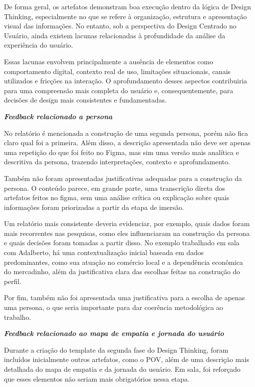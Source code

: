 \documentclass[
  sigconf,
  nonacm, %
  language=portuguese
]{acmart}
\begin{document}
De forma geral, os artefatos demonstram boa execução dentro da lógica de Design Thinking, especialmente no que se refere à organização, estrutura e apresentação visual das informações. No entanto, sob a perspectiva do Design Centrado no Usuário, ainda existem lacunas relacionadas à profundidade da análise da experiência do usuário.

Essas lacunas envolvem principalmente a ausência de elementos como comportamento digital, contexto real de uso, limitações situacionais, canais utilizados e fricções na interação. O aprofundamento desses aspectos contribuiria para uma compreensão mais completa do usuário e, consequentemente, para decisões de design mais consistentes e fundamentadas.

\textit{\textbf{Feedback relacionado a persona}}

No relatório é mencionada a construção de uma segunda persona, porém não fica claro qual foi a primeira. Além disso, a descrição apresentada não deve ser apenas uma repetição do que foi feito no Figma, mas sim uma versão mais analítica e descritiva da persona, trazendo interpretações, contexto e aprofundamento.

Também não foram apresentadas justificativas adequadas para a construção da persona. O conteúdo parece, em grande parte, uma transcrição direta dos artefatos feitos no figma, sem uma análise crítica ou explicação sobre quais informações foram priorizadas a partir da etapa de imersão.

Um relatório mais consistente deveria evidenciar, por exemplo, quais dados foram mais recorrentes nas pesquisas, como eles influenciaram na construção da persona e quais decisões foram tomadas a partir disso. No exemplo trabalhado em sala com Adalberto, há uma contextualização inicial baseada em dados predominantes, como sua atuação no comércio local e a dependência econômica do mercadinho, além da justificativa clara das escolhas feitas na construção do perfil.

Por fim, também não foi apresentada uma justificativa para a escolha de apenas uma persona, o que seria importante para dar coerência metodológica ao trabalho.

\textit{\textbf{Feedback relacionado ao mapa de empatia e jornada do usuário}}

Durante a criação do template da segunda fase do Design Thinking, foram incluídos inicialmente outros artefatos, como o POV, além de uma descrição mais detalhada do mapa de empatia e da jornada do usuário. Em sala, foi reforçado que esses elementos não seriam mais obrigatórios nessa etapa.
\end{document}

